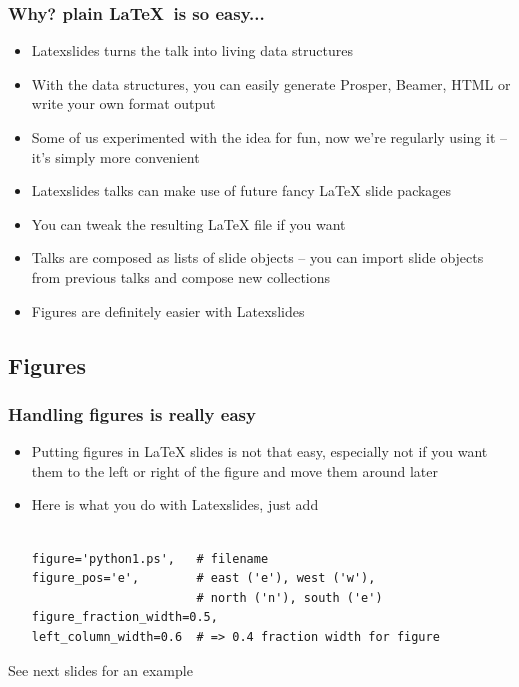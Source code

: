 \documentclass{beamer}
\begin{document}
\begin{frame}
\frametitle{Why? plain \LaTeX~is so easy...}

\begin{block}

\begin{itemize}
\item<2,9> Latexslides turns the talk into living data structures
\item<3,9> With the data structures, you can easily generate Prosper, Beamer, HTML or write your own format output
\item<4,9> Some of us experimented with the idea for fun, now we're regularly using it -- it's simply more convenient
\item<5,9> Latexslides talks can make use of future fancy \LaTeX{} slide packages
\item<6,9> You can tweak the resulting \LaTeX{} file if you want
\item<7,9> Talks are composed as lists of slide objects -- you can import slide objects from previous talks and compose new collections
\item<8,9> Figures are definitely easier with Latexslides
\end{itemize}

\end{block}

\end{frame}

\subsection{Figures}


\begin{frame}[fragile]
\frametitle{Handling figures is really easy}

\begin{block}

\begin{itemize}
\item Putting figures in \LaTeX{} slides is not that easy, especially not if you want them to the left or right of the figure and move them around later
\item Here is what you do with Latexslides, just add\begin{Verbatim}[fontsize=\footnotesize,tabsize=4,baselinestretch=0.85,fontfamily=tt,xleftmargin=7mm]

figure='python1.ps',   # filename
figure_pos='e',        # east ('e'), west ('w'),
                       # north ('n'), south ('e')
figure_fraction_width=0.5,
left_column_width=0.6  # => 0.4 fraction width for figure
\end{Verbatim}

\end{itemize}

\end{block}
See next slides for an example

\end{frame}
\end{document}
